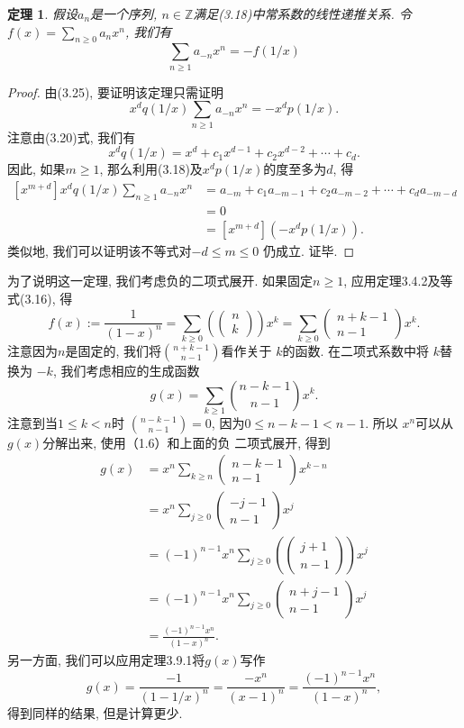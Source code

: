 \documentclass[a4paper,12pt]{ctexbook}
\newtheorem{theorem}[lemma]{\hspace{2em}定理}%
\begin{document}
\begin{theorem}
	假设$a_{n}$是一个序列,  $n \in \mathbb{Z}$满足(3.18)中常系数的线性递推关系. 令$f(x)=\sum_{n \geq 0} a_{n} x^{n}$, 我们有$$
	\sum_{n \geq 1} a_{-n} x^{n}=-f(1 / x)
	$$
\end{theorem}
\begin{proof}
	由(3.25), 要证明该定理只需证明$$
	x^{d} q(1 / x) \sum_{n \geq 1} a_{-n} x^{n}=-x^{d} p(1 / x).
	$$注意由(3.20)式, 我们有$$
	x^{d} q(1 / x)=x^{d}+c_{1} x^{d-1}+c_{2} x^{d-2}+\cdots+c_{d} .
	$$因此, 如果$m \geq 1$, 那么利用(3.18)及$x^{d} p(1 / x)$的度至多为$d$, 得$$
	\begin{aligned}
	{\left[x^{m+d}\right] x^{d} q(1 / x) \sum_{n \geq 1} a_{-n} x^{n} } &=a_{-m}+c_{1} a_{-m-1}+c_{2} a_{-m-2}+\cdots+c_{d} a_{-m-d} \\
	&=0 \\
	&=\left[x^{m+d}\right]\left(-x^{d} p(1 / x)\right) .
	\end{aligned}
	$$
	类似地, 我们可以证明该不等式对$-d \leq m \leq0$ 仍成立. 证毕.
\end{proof}
为了说明这一定理, 我们考虑负的二项式展开. 如果固定$n \geq 1$, 应用定理3.4.2及等式(3.16), 得
$$
f(x):=\frac{1}{(1-x)^{n}}=\sum_{k \geq 0}\left(\left(\begin{array}{l}
n \\
k
\end{array}\right)\right) x^{k}=\sum_{k \geq 0}\left(\begin{array}{c}
n+k-1 \\
n-1
\end{array}\right) x^{k}.
$$
注意因为$n$是固定的, 我们将$\binom{n+k-1}{n-1}$看作关于 $k$的函数. 在二项式系数中将 $k$替换为 $-k$, 我们考虑相应的生成函数
$$
g(x)=\sum_{k \geq 1}\binom{n-k-1}{n-1}x^{k}.
$$
注意到当$1 \leq k<n$时 $\binom{n-k-1}{n-1}=0$, 因为$0 \leq n-k-1<n-1$. 所以 $x^{n}$可以从 $g(x)$分解出来, 使用（1.6）和上面的负
二项式展开, 得到
$$
\begin{aligned}
g(x) &=x^{n} \sum_{k \geq n}\left(\begin{array}{c}
n-k-1 \\
n-1
\end{array}\right) x^{k-n} \\
&=x^{n} \sum_{j \geq 0}\left(\begin{array}{c}
-j-1 \\
n-1
\end{array}\right) x^{j} \\
&=(-1)^{n-1} x^{n} \sum_{j \geq 0}\left(\left(\begin{array}{c}
j+1 \\
n-1
\end{array}\right)\right) x^{j} \\
&=(-1)^{n-1} x^{n} \sum_{j \geq 0}\left(\begin{array}{c}
n+j-1 \\
n-1
\end{array}\right) x^{j} \\
&=\frac{(-1)^{n-1} x^{n}}{(1-x)^{n}} .
\end{aligned}
$$
另一方面, 我们可以应用定理3.9.1将$g(x)$写作
$$
g(x)=\frac{-1}{(1-1 / x)^{n}}=\frac{-x^{n}}{(x-1)^{n}}=\frac{(-1)^{n-1} x^{n}}{(1-x)^{n}},
$$
得到同样的结果, 但是计算更少.
\end{document}

